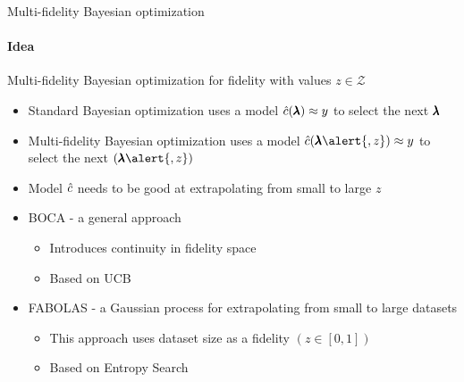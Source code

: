 \begin{frame}[c]{Multi-fidelity Bayesian optimization}
\framesubtitle{Idea}

\alert{Multi-fidelity Bayesian optimization} for fidelity with values $z\in \mathcal{Z}$ 
\begin{itemize}
	\item Standard Bayesian optimization uses a model $\hat{c}(\pmb{\lambda}) \approx y$ to select the next $\pmb{\lambda}$
	\item \alert{Multi-fidelity Bayesian optimization} uses a model $\surro(\conf\alert{, z}) \approx y$ to select the next $(\conf\alert{, z})$
    \pause
    \smallskip
    
	\item Model $\hat{c}$ needs to be good at extrapolating from small to large $z$
	
	\item BOCA - a general approach
	\begin{itemize}
	    \item Introduces continuity in fidelity space
		\item Based on \alert{UCB}
	\end{itemize}
    
	\item FABOLAS - a Gaussian process for extrapolating from small to large datasets
	\begin{itemize}
		\item This approach uses dataset size as a fidelity $(z \in [0, 1])$
		\item Based on \alert{Entropy Search}
	\end{itemize}
	
\end{itemize}
\end{frame}


